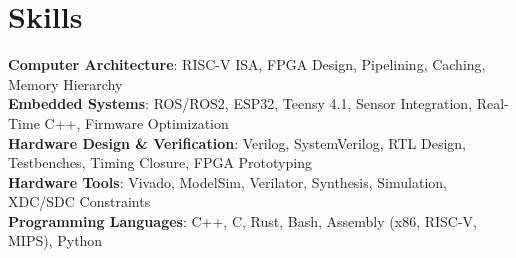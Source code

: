 \section{Skills}
 \begin{itemize}[leftmargin=0.15in, label={}]
    \small{\item{
     \textbf{Computer Architecture}{: RISC-V ISA, FPGA Design, Pipelining, Caching, Memory Hierarchy} \\
		 \textbf{Embedded Systems}{: ROS/ROS2, ESP32, Teensy 4.1, Sensor Integration, Real-Time C++, Firmware Optimization} \\
		 \textbf{Hardware Design \& Verification}{: Verilog, SystemVerilog, RTL Design, Testbenches, Timing Closure, FPGA Prototyping} \\
		 \textbf{Hardware Tools}{: Vivado, ModelSim, Verilator, Synthesis, Simulation, XDC/SDC Constraints} \\
     \textbf{Programming Languages}{: C++, C, Rust, Bash, Assembly (x86, RISC-V, MIPS), Python} \\
    }}
 \end{itemize}

